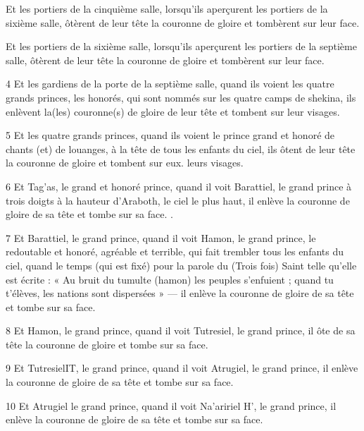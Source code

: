 \par Et les portiers de la cinquième salle, lorsqu'ils aperçurent les portiers de la sixième salle, ôtèrent de leur tête la couronne de gloire et tombèrent sur leur face.

\par Et les portiers de la sixième salle, lorsqu'ils aperçurent les portiers de la septième salle, ôtèrent de leur tête la couronne de gloire et tombèrent sur leur face.

\par 4 Et les gardiens de la porte de la septième salle, quand ils voient les quatre grands princes, les honorés, qui sont nommés sur les quatre camps de shekina, ils enlèvent la(les) couronne(s) de gloire de leur tête et tombent sur leur visages.

\par 5 Et les quatre grands princes, quand ils voient le prince grand et honoré de chants (et) de louanges, à la tête de tous les enfants du ciel, ils ôtent de leur tête la couronne de gloire et tombent sur eux. leurs visages.

\par 6 Et Tag'as, le grand et honoré prince, quand il voit Barattiel, le grand prince à trois doigts à la hauteur d'Araboth, le ciel le plus haut, il enlève la couronne de gloire de sa tête et tombe sur sa face. .

\par 7 Et Barattiel, le grand prince, quand il voit Hamon, le grand prince, le redoutable et honoré, agréable et terrible, qui fait trembler tous les enfants du ciel, quand le temps (qui est fixé) pour la parole du (Trois fois) Saint telle qu'elle est écrite : « Au bruit du tumulte (hamon) les peuples s'enfuient ; quand tu t'élèves, les nations sont dispersées » — il enlève la couronne de gloire de sa tête et tombe sur sa face.

\par 8 Et Hamon, le grand prince, quand il voit Tutresiel, le grand prince, il ôte de sa tête la couronne de gloire et tombe sur sa face.

\par 9 Et TutresielIT, le grand prince, quand il voit Atrugiel, le grand prince, il enlève la couronne de gloire de sa tête et tombe sur sa face.

\par 10 Et Atrugiel le grand prince, quand il voit Na'aririel H', le grand prince, il enlève la couronne de gloire de sa tête et tombe sur sa face.

